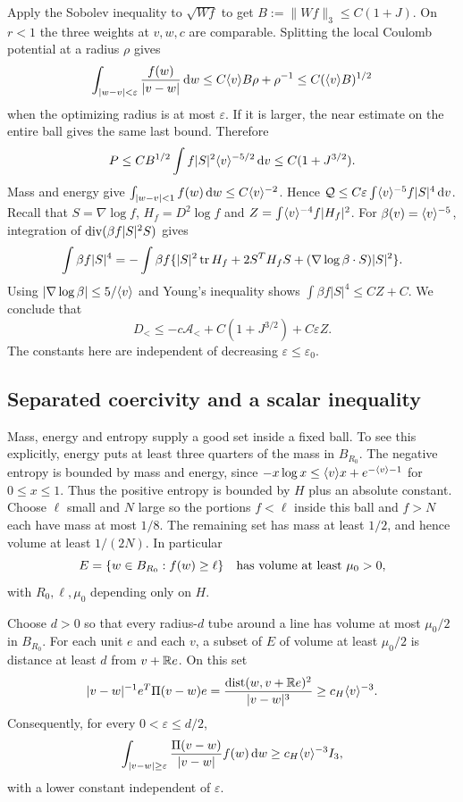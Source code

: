Apply the Sobolev inequality to $\sqrt{Wf}$ to get
$B:=\|Wf\|_3\le C(1+J)$. On $r<1$ the three weights at $v,w,c$ are comparable. Splitting the local Coulomb potential at a radius $\rho$ gives
\[
 \int_{|w-v|<\varepsilon}\frac{f(w)}{|v-w|}\,\mathrm dw
 \le C\langle v\rangle B\rho+\rho^{-1}
 \le C(\langle v\rangle B)^{1/2}
\]
when the optimizing radius is at most $\varepsilon$. If it is larger, the near estimate on the entire ball gives the same last bound. Therefore
\[
 P\le CB^{1/2}\int f|S|^2\langle v\rangle^{-5/2}\,\mathrm dv\le C(1+J^{3/2}).
\]
Mass and energy give $\int_{|w-v|<1}f(w)\,\mathrm dw\le C\langle v\rangle^{-2}$. Hence
$\mathcal Q\le C\varepsilon\int\langle v\rangle^{-5}f|S|^4\,\mathrm dv$.
Recall that $S=\nabla\log f$, $H_f=D^2\log f$ and $Z=\int\langle v\rangle^{-4}f|H_f|^2$. For $\beta(v)=\langle v\rangle^{-5}$, integration of $\operatorname{div}(\beta f|S|^2S)$ gives
\[
 \int\beta f|S|^4=-\int\beta f
 \{|S|^2\operatorname{tr} H_f+2S^TH_fS+(\nabla\log\beta\cdot S)|S|^2\}.
\]
Using $|\nabla\log\beta|\le5/\langle v\rangle$ and Young's inequality shows
$\int\beta f|S|^4\le C Z+C$. We conclude that
\begin{equation}\label{eq:near-bound}
 D_<\le-c\mathcal A_<+C(1+J^{3/2})+C\varepsilon Z.
\end{equation}
The constants here are independent of decreasing $\varepsilon\le\varepsilon_0$.

\subsection{Separated coercivity and a scalar inequality}

Mass, energy and entropy supply a good set inside a fixed ball. To see this explicitly, energy puts at least three quarters of the mass in $B_{R_0}$. The negative entropy is bounded by mass and energy, since
$-x\log x\le\langle v\rangle x+e^{-\langle v\rangle-1}$ for $0\le x\le1$. Thus the positive entropy is bounded by $H$ plus an absolute constant. Choose $\ell$ small and $N$ large so the portions $f<\ell$ inside this ball and $f>N$ each have mass at most $1/8$. The remaining set has mass at least $1/2$, and hence volume at least $1/(2N)$. In particular
\[
 E=\{w\in B_{R_0}:f(w)\ge\ell\}
 \quad\hbox{has volume at least }\mu_0>0,
\]
with $R_0,\ell,\mu_0$ depending only on $H$.

Choose $d>0$ so that every radius-$d$ tube around a line has volume at most $\mu_0/2$ in $B_{R_0}$. For each unit $e$ and each $v$, a subset of $E$ of volume at least $\mu_0/2$ is distance at least $d$ from $v+\mathbb R e$. On this set
\[
 |v-w|^{-1}e^T\Pi(v-w)e
 =\frac{\operatorname{dist}(w,v+\mathbb R e)^2}{|v-w|^3}
 \ge c_H\langle v\rangle^{-3}.
\]
Consequently, for every $0<\varepsilon\le d/2$,
\begin{equation}\label{eq:separated-ellipticity}
 \int_{|v-w|\ge\varepsilon}\frac{\Pi(v-w)}{|v-w|}f(w)\,\mathrm dw
 \ge c_H\langle v\rangle^{-3}I_3,
\end{equation}
with a lower constant independent of $\varepsilon$.

